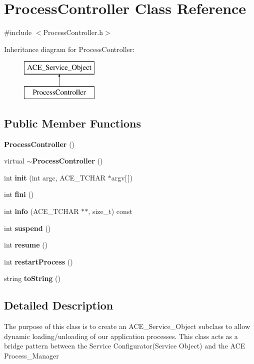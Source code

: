 \section{Process\+Controller Class Reference}
\label{classProcessController}


{\ttfamily \#include $<$Process\+Controller.\+h$>$}

Inheritance diagram for Process\+Controller\+:\begin{figure}[H]
\begin{center}
\leavevmode
\includegraphics[height=2.000000cm]{classProcessController}
\end{center}
\end{figure}
\subsection*{Public Member Functions}
\begin{DoxyCompactItemize}
\item 
{\bf Process\+Controller} ()
\item 
virtual {\bf $\sim$\+Process\+Controller} ()
\item 
int {\bf init} (int argc, A\+C\+E\+\_\+\+T\+C\+H\+AR $\ast$argv[$\,$])
\item 
int {\bf fini} ()
\item 
int {\bf info} (A\+C\+E\+\_\+\+T\+C\+H\+AR $\ast$$\ast$, size\+\_\+t) const 
\item 
int {\bf suspend} ()
\item 
int {\bf resume} ()
\item 
int {\bf restart\+Process} ()
\item 
string {\bf to\+String} ()
\end{DoxyCompactItemize}


\subsection{Detailed Description}
The purpose of this class is to create an A\+C\+E\+\_\+\+Service\+\_\+\+Object subclass to allow dynamic loading/unloading of our application processes. This class acts as a bridge pattern between the Service Configurator(\+Service Object) and the A\+CE Process\+\_\+\+Manager 

